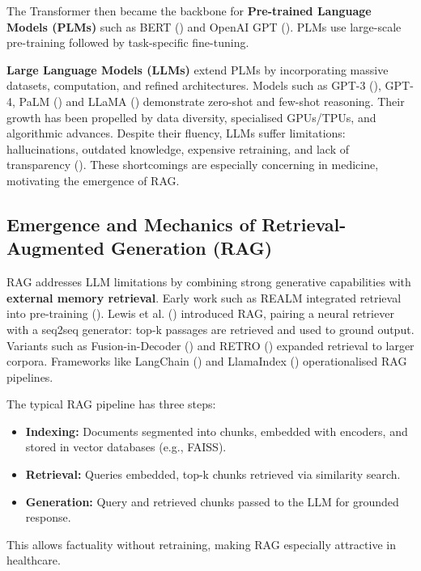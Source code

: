 The Transformer then became the backbone for \textbf{Pre-trained Language Models (PLMs)} such as BERT (\citep{devlin2019bert}) and OpenAI GPT (\citep{radford2019language}). PLMs use large-scale pre-training followed by task-specific fine-tuning.

\textbf{Large Language Models (LLMs)} extend PLMs by incorporating massive datasets, computation, and refined architectures. Models such as GPT-3 (\citep{brown2020language}), GPT-4, PaLM (\citep{chowdhery2022palm}) and LLaMA (\citep{touvron2023llama}) demonstrate zero-shot and few-shot reasoning. Their growth has been propelled by data diversity, specialised GPUs/TPUs, and algorithmic advances. Despite their fluency, LLMs suffer limitations: hallucinations, outdated knowledge, expensive retraining, and lack of transparency (\citep{ji2023survey}). These shortcomings are especially concerning in medicine, motivating the emergence of RAG.

\subsection{Emergence and Mechanics of Retrieval-Augmented Generation (RAG)}

RAG addresses LLM limitations by combining strong generative capabilities with \textbf{external memory retrieval}. Early work such as REALM integrated retrieval into pre-training (\citep{guu2020realm}). Lewis et al. (\citeyear{lewis2020rag}) introduced RAG, pairing a neural retriever with a seq2seq generator: top-k passages are retrieved and used to ground output. Variants such as Fusion-in-Decoder (\citep{izacard2021leveraging}) and RETRO (\citep{borgeaud2022retro}) expanded retrieval to larger corpora. Frameworks like LangChain (\citep{langchain2023}) and LlamaIndex (\citep{llamaindex2023}) operationalised RAG pipelines.

The typical RAG pipeline has three steps:
\begin{itemize}
  \item \textbf{Indexing:} Documents segmented into chunks, embedded with encoders, and stored in vector databases (e.g., FAISS).
  \item \textbf{Retrieval:} Queries embedded, top-k chunks retrieved via similarity search.
  \item \textbf{Generation:} Query and retrieved chunks passed to the LLM for grounded response.
\end{itemize}

This allows factuality without retraining, making RAG especially attractive in healthcare.

